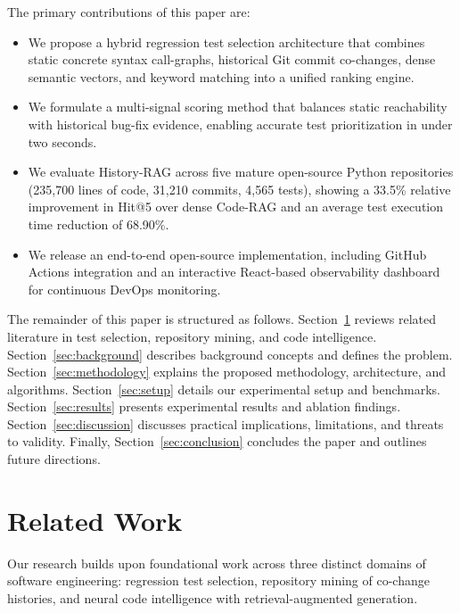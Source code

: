 \documentclass[12pt,onecolumn,draftclsnofoot]{IEEEtran}
\begin{document}
The primary contributions of this paper are:
\begin{itemize}
    \item We propose a hybrid regression test selection architecture that combines static concrete syntax call-graphs, historical Git commit co-changes, dense semantic vectors, and keyword matching into a unified ranking engine.
    \item We formulate a multi-signal scoring method that balances static reachability with historical bug-fix evidence, enabling accurate test prioritization in under two seconds.
    \item We evaluate History-RAG across five mature open-source Python repositories (235,700 lines of code, 31,210 commits, 4,565 tests), showing a 33.5\% relative improvement in Hit@5 over dense Code-RAG and an average test execution time reduction of 68.90\%.
    \item We release an end-to-end open-source implementation, including GitHub Actions integration and an interactive React-based observability dashboard for continuous DevOps monitoring.
\end{itemize}

The remainder of this paper is structured as follows. Section~\ref{sec:related} reviews related literature in test selection, repository mining, and code intelligence. Section~\ref{sec:background} describes background concepts and defines the problem. Section~\ref{sec:methodology} explains the proposed methodology, architecture, and algorithms. Section~\ref{sec:setup} details our experimental setup and benchmarks. Section~\ref{sec:results} presents experimental results and ablation findings. Section~\ref{sec:discussion} discusses practical implications, limitations, and threats to validity. Finally, Section~\ref{sec:conclusion} concludes the paper and outlines future directions.

\section{Related Work}
\label{sec:related}
Our research builds upon foundational work across three distinct domains of software engineering: regression test selection, repository mining of co-change histories, and neural code intelligence with retrieval-augmented generation.
\end{document}
